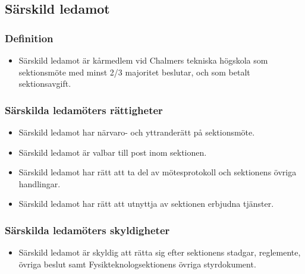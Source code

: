 \documentclass[11pt,a4paper]{article}
\begin{document}
\newpage


\subsection{Särskild ledamot}

\subsubsection{Definition}

\begin{itemize}

  \item Särskild ledamot är kårmedlem vid Chalmers tekniska högskola
  som sektionsmöte med minst 2/3 majoritet beslutar, och som betalt
  sektionsavgift.

\end{itemize}

\subsubsection{Särskilda ledamöters rättigheter}

\begin{itemize}

   \item Särskild ledamot har närvaro- och yttranderätt på
   sektionsmöte.

   \item Särskild ledamot är valbar till post inom sektionen.

   \item Särskild ledamot har rätt att ta del av mötesprotokoll och
   sektionens övriga handlingar.

   \item Särskild ledamot har rätt att utnyttja av sektionen erbjudna
   tjänster.

\end{itemize}

\subsubsection{Särskilda ledamöters skyldigheter}

\begin{itemize}


\item Särskild ledamot är skyldig att rätta sig efter sektionens stadgar,
   regle\-mente, övriga beslut samt Fysikteknologsektionens övriga styrdokument.


\end{itemize}
\end{document}
